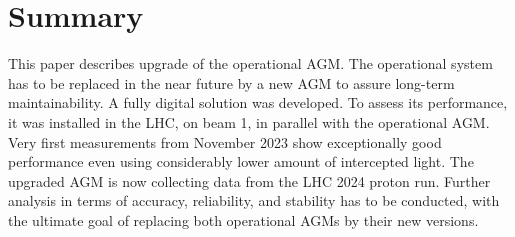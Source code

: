 \section{Summary}
This paper describes upgrade of the operational AGM.
%
The operational system has to be replaced in the near future by a new AGM to assure long-term maintainability.
%
A fully digital solution was developed.
%
To assess its performance, it was installed in the LHC, on beam 1, in parallel with the operational AGM.
%
Very first measurements from November 2023 show exceptionally good performance even using considerably lower amount of intercepted light.
%
The upgraded AGM is now collecting data from the LHC 2024 proton run.
%
Further analysis in terms of accuracy, reliability, and stability has to be conducted, with the ultimate goal of replacing both operational AGMs by their new versions.





